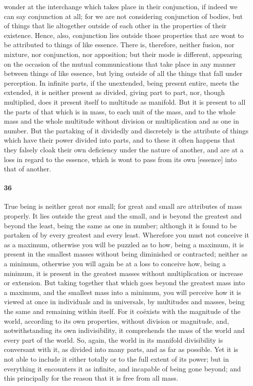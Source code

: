 \documentclass{article}
\begin{document}
wonder at the interchange which takes place in their conjunction, if indeed we can say conjunction at all; for we are not considering conjunction of bodies, but of things that lie altogether outside of each other in the properties of their existence. Hence, also, conjunction lies outside those properties that are wont to be attributed to things of like essence. There is, therefore, neither fusion, nor mixture, nor conjunction, nor apposition; but their mode is different, appearing on the occasion of the mutual communications that take place in any manner between things of like essence, but lying outside of all the things that fall under perception. In infinite parts, if the unextended, being present entire, meets the extended, it is neither present as divided, giving part to part, nor, though multiplied, does it present itself to multitude as manifold. But it is present to all the parts of that which is in mass, to each unit of the mass, and to the whole mass and the whole multitude without division or multiplication and as one in number. But the partaking of it dividedly and discretely is the attribute of things which have their power divided into parts, and to these it often happens that they falsely cloak their own deficiency under the nature of another, and are at a loss in regard to the essence, which is wont to pass from its own [essence] into that of another.

\paragraph{36} True being is neither great nor small; for great and small are attributes of mass properly. It lies outside the great and the small, and is beyond the greatest and beyond the least, being the same as one in number; although it is found to be partaken of by every greatest and every least. Wherefore you must not conceive it as a maximum, otherwise you will be puzzled as to how, being a maximum, it is present in the smallest masses without being diminished or contracted; neither as a minimum, otherwise you will again be at a loss to conceive how, being a minimum, it is present in the greatest masses without multiplication or increase or extension. But taking together that which goes beyond the greatest mass into a maximum, and the smallest mass into a minimum, you will perceive how it is viewed at once in individuals and in universals, by multitudes and masses, being the same and remaining within itself. For it co\"{e}xists with the magnitude of the world, according to its own properties, without division or magnitude, and, notwithstanding its own indivisibility, it comprehends the mass of the world and every part of the world. So, again, the world in its manifold divisibility is conversant with it, as divided into many parts, and as far as possible. Yet it is not able to include it either totally or to the full extent of its power; but in everything it encounters it as infinite, and incapable of being gone beyond; and this principally for the reason that it is free from all mass.
\end{document}
